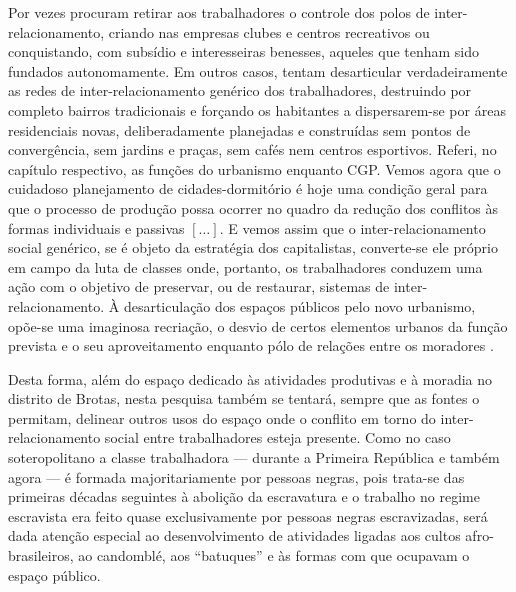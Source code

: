 \begin{citacao}
Por vezes procuram retirar aos trabalhadores o controle dos polos de inter-relacionamento, criando nas empresas clubes e centros recreativos ou conquistando, com subsídio e interesseiras benesses, aqueles que tenham sido fundados autonomamente. Em outros casos, tentam desarticular verdadeiramente as redes de inter-relacionamento genérico dos trabalhadores, destruindo por completo bairros tradicionais e forçando os habitantes a dispersarem-se por áreas residenciais novas, deliberadamente planejadas e construídas sem pontos de convergência, sem jardins e praças, sem cafés nem centros esportivos. Referi, no capítulo respectivo, as funções do urbanismo enquanto CGP. Vemos agora que o cuidadoso planejamento de cidades-dormitório é hoje uma condição geral para que o processo de produção possa ocorrer no quadro da redução dos conflitos às formas individuais e passivas \([\dots]\). E vemos assim que o inter-relacionamento social genérico, se é objeto da estratégia dos capitalistas, converte-se ele próprio em campo da luta de classes onde, portanto, os trabalhadores conduzem uma ação com o objetivo de preservar, ou de restaurar, sistemas de inter-relacionamento. À desarticulação dos espaços públicos pelo novo urbanismo, opõe-se uma imaginosa recriação, o desvio de certos elementos urbanos da função prevista e o seu aproveitamento enquanto pólo de relações entre os moradores \cite[pp.~330-331]{BERNARDO1991}. 
\end{citacao}

Desta forma, além do espaço dedicado às atividades produtivas e à moradia no distrito de Brotas, nesta pesquisa também se tentará, sempre que as fontes o permitam, delinear outros usos do espaço onde o conflito em torno do inter-relacionamento social entre trabalhadores esteja presente. Como no caso soteropolitano a classe trabalhadora --- durante a Primeira República e também agora --- é formada majoritariamente por pessoas negras, pois trata-se das primeiras décadas seguintes à abolição da escravatura e o trabalho no regime escravista era feito quase exclusivamente por pessoas negras escravizadas, será dada atenção especial ao desenvolvimento de atividades ligadas aos cultos afro-brasileiros, ao candomblé, aos ``batuques'' e às formas com que ocupavam o espaço público.

